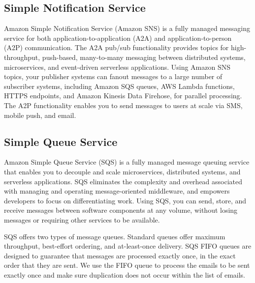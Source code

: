\subsection{Simple Notification Service}
%

Amazon Simple Notification Service (Amazon SNS) is a fully managed messaging service for both application-to-application (A2A) and application-to-person (A2P) communication. The A2A pub/sub functionality provides topics for high-throughput, push-based, many-to-many messaging between distributed systems, microservices, and event-driven serverless applications. Using Amazon SNS topics, your publisher systems can fanout messages to a large number of subscriber systems, including Amazon SQS queues, AWS Lambda functions, HTTPS endpoints, and Amazon Kinesis Data Firehose, for parallel processing. The A2P functionality enables you to send messages to users at scale via SMS, mobile push, and email.\cite{awssns}
\subsection{Simple Queue Service}
Amazon Simple Queue Service (SQS) is a fully managed message queuing service that enables you to decouple and scale microservices, distributed systems, and serverless applications. SQS eliminates the complexity and overhead associated with managing and operating message-oriented middleware, and empowers developers to focus on differentiating work. Using SQS, you can send, store, and receive messages between software components at any volume, without losing messages or requiring other services to be available. 

SQS offers two types of message queues. Standard queues offer maximum throughput, best-effort ordering, and at-least-once delivery. SQS FIFO queues are designed to guarantee that messages are processed exactly once, in the exact order that they are sent. We use the FIFO queue to process the emails to be sent exactly once and make sure duplication does not occur within the list of emails.\cite{awssqs}

